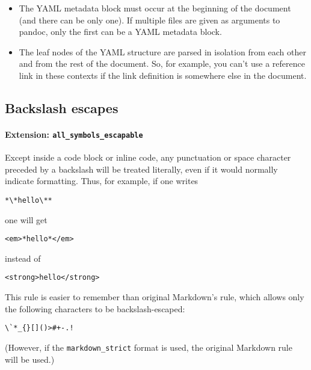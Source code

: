 \documentclass[
]{article}
\begin{document}
\begin{itemize}
\item
  The YAML metadata block must occur at the beginning of the document
  (and there can be only one). If multiple files are given as arguments
  to pandoc, only the first can be a YAML metadata block.
\item
  The leaf nodes of the YAML structure are parsed in isolation from each
  other and from the rest of the document. So, for example, you can't
  use a reference link in these contexts if the link definition is
  somewhere else in the document.
\end{itemize}

\hypertarget{backslash-escapes}{%
\subsection{Backslash escapes}\label{backslash-escapes}}

\hypertarget{extension-all_symbols_escapable}{%
\paragraph{\texorpdfstring{Extension:
\texttt{all\_symbols\_escapable}}{Extension: all\_symbols\_escapable}}\label{extension-all_symbols_escapable}}

Except inside a code block or inline code, any punctuation or space
character preceded by a backslash will be treated literally, even if it
would normally indicate formatting. Thus, for example, if one writes

\begin{verbatim}
*\*hello\**
\end{verbatim}

one will get

\begin{verbatim}
<em>*hello*</em>
\end{verbatim}

instead of

\begin{verbatim}
<strong>hello</strong>
\end{verbatim}

This rule is easier to remember than original Markdown's rule, which
allows only the following characters to be backslash-escaped:

\begin{verbatim}
\`*_{}[]()>#+-.!
\end{verbatim}

(However, if the \texttt{markdown\_strict} format is used, the original
Markdown rule will be used.)
\end{document}
